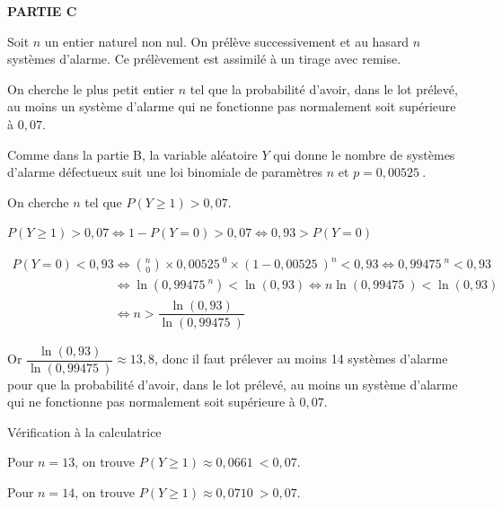 \documentclass[10pt]{article}
\providecommand{\np}[2][]{{#2~#1}}
\providecommand{\ds}{\displaystyle}
\begin{document}
\medskip

\textbf{PARTIE C}

\medskip

Soit $n$ un entier naturel non nul. On prélève successivement et au hasard $n$ systèmes d'alarme. Ce prélèvement est assimilé à un tirage avec remise.

On cherche le plus petit entier $n$ tel que la probabilité d'avoir, dans le lot prélevé, au moins un système d'alarme qui ne fonctionne pas normalement soit supérieure à $0,07$.

Comme dans la partie B, la variable aléatoire $Y$ qui donne le nombre de systèmes d'alarme défectueux suit une loi binomiale de paramètres $n$ et $p= \np{0,00525}$.

On cherche $n$ tel que $P(Y\geqslant 1) >0,07$.

$P(Y\geqslant 1) >0,07 \iff 1-P(Y=0)>0,07 \iff 0,93 > P(Y=0)$

$\begin{gathered}P(Y=0)<0,93 
\iff \ds\binom{n}{0}\times \np{0,00525}^0 \times (1-\np{0,00525})^n <0,93
\iff \np{0,99475}^n < 0,93\\
\phantom{P(Y=0)<0,93}
\iff \ln \left (\np{0,99475}^n\right ) < \ln(0,93)
\iff n \ln \left (\np{0,99475}\right )  < \ln(0,93)\\
\phantom{P(Y=0)<0,93}
\iff n> \dfrac{\ln(0,93)}{\ln \left (\np{0,99475}\right )}\end{gathered}$

Or $\dfrac{\ln(0,93)}{\ln \left (\np{0,99475}\right )} \approx 13,8$, donc il faut prélever au moins 14 systèmes d'alarme pour que la probabilité d'avoir, dans le lot prélevé, au moins un système d'alarme qui ne fonctionne pas normalement soit supérieure à $0,07$.


\begin{list}{\textbullet}{Vérification à la calculatrice}
\item Pour $n=13$, on trouve $P(Y\geqslant 1) \approx \np{0,0661}<0,07$.
\item Pour $n=14$, on trouve $P(Y\geqslant 1) \approx \np{0,0710}>0,07$.
\end{list}

\vspace{0.5cm}
\end{document}
